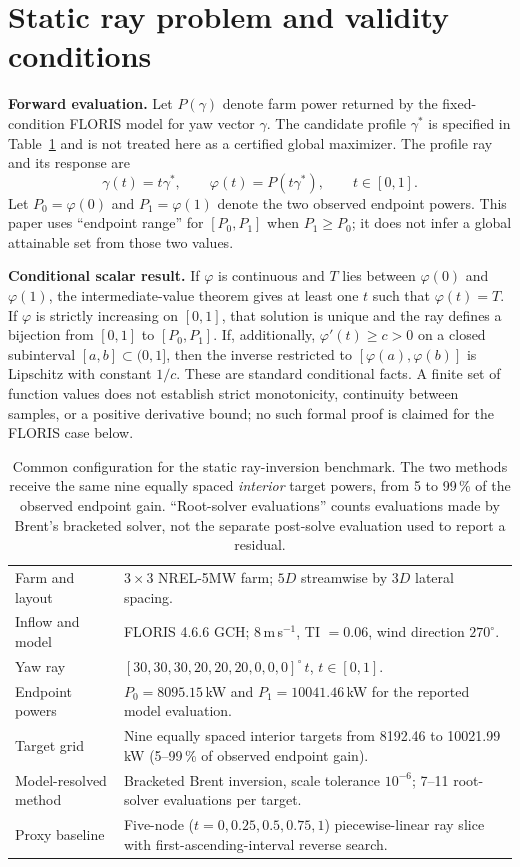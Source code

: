 \documentclass[wes, manuscript]{copernicus}
\begin{document}
\section{Static ray problem and validity conditions}
\label{sec:problem}

\textbf{Forward evaluation.} Let $P(\gamma)$ denote farm power returned by the fixed-condition FLORIS model for yaw vector $\gamma$. The candidate profile $\gamma^\ast$ is specified in Table~\ref{tab:benchmark} and is not treated here as a certified global maximizer. The profile ray and its response are
\[
\gamma(t)=t\gamma^\ast,\qquad \varphi(t)=P(t\gamma^\ast),\qquad t\in[0,1].
\]
Let $P_0=\varphi(0)$ and $P_1=\varphi(1)$ denote the two observed endpoint powers. This paper uses ``endpoint range'' for $[P_0,P_1]$ when $P_1\ge P_0$; it does not infer a global attainable set from those two values.

\textbf{Conditional scalar result.} If $\varphi$ is continuous and $T$ lies between $\varphi(0)$ and $\varphi(1)$, the intermediate-value theorem gives at least one $t$ such that $\varphi(t)=T$. If $\varphi$ is strictly increasing on $[0,1]$, that solution is unique and the ray defines a bijection from $[0,1]$ to $[P_0,P_1]$. If, additionally, $\varphi'(t)\ge c>0$ on a closed subinterval $[a,b]\subset(0,1]$, then the inverse restricted to $[\varphi(a),\varphi(b)]$ is Lipschitz with constant $1/c$. These are standard conditional facts. A finite set of function values does not establish strict monotonicity, continuity between samples, or a positive derivative bound; no such formal proof is claimed for the FLORIS case below.

\begin{table}[htbp]
\caption{Common configuration for the static ray-inversion benchmark. The two methods receive the same nine equally spaced \emph{interior} target powers, from 5 to 99\,\% of the observed endpoint gain. ``Root-solver evaluations'' counts evaluations made by Brent's bracketed solver, not the separate post-solve evaluation used to report a residual.}
\begin{tabular}{p{}p{}}
\hline
Farm and layout & $3\times3$ NREL-5MW farm; $5D$ streamwise by $3D$ lateral spacing. \\
Inflow and model & FLORIS 4.6.6 GCH; $8$\,m\,s$^{-1}$, TI $=0.06$, wind direction $270^\circ$. \\
Yaw ray & $[30,30,30,20,20,20,0,0,0]^\circ\,t$, $t\in[0,1]$. \\
Endpoint powers & $P_0=8095.15$\,kW and $P_1=10041.46$\,kW for the reported model evaluation. \\
Target grid & Nine equally spaced interior targets from 8192.46 to 10021.99\,kW (5--99\,\% of observed endpoint gain). \\
Model-resolved method & Bracketed Brent inversion, scale tolerance $10^{-6}$; 7--11 root-solver evaluations per target. \\
Proxy baseline & Five-node ($t=0,0.25,0.5,0.75,1$) piecewise-linear ray slice with first-ascending-interval reverse search. \\
\hline
\end{tabular}
\label{tab:benchmark}
\end{table}
\end{document}
